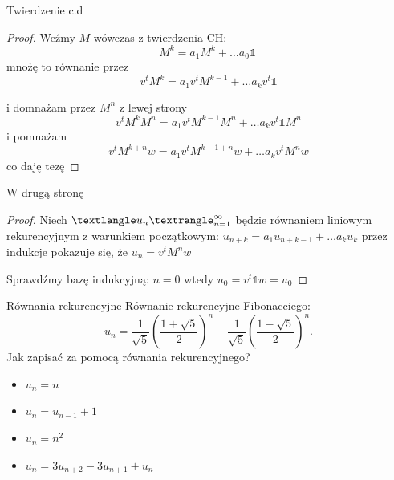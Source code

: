 \documentclass[handout]{beamer}
\theoremstyle{definition}
\theoremstyle{named}
\begin{document}
\begin{frame}{Twierdzenie c.d}

\begin{proof}
    Weźmy $M$ wówczas z twierdzenia CH: 
    \begin{equation}
        M^{k} =  a_1 M^{k} + \ldots a_0 \mathbb{1} \
    \end{equation}
    mnożę to równanie przez 
    \begin{equation}
        v^{t}M^{k} = a_1 v^{t} M^{k-1} + \ldots a_k v^{t} \mathbb{1} 
    \end{equation} 


i domnażam przez $M^{n}$ z lewej strony 
      \begin{equation}
          v^{t}M^{k} M^{n} = a_1 v^{t} M^{k-1} M^{n} + \ldots a_k v^{t} \mathbb{1} M^{n}
      \end{equation}
      i pomnażam 
      $$ v^{t}M^{k + n} w = a_1 v^{t} M^{k-1 + n}w + \ldots a_k v^{t} M^{n}w $$ 
      co daję tezę
\end{proof}
\end{frame}

\begin{frame}{W drugą stronę}
\begin{proof}
    Niech $\textlangle u_n \textrangle_{n=1}^{\infty}$ będzie równaniem liniowym rekurencyjnym z warunkiem początkowym:
    $u_{n+k} = a_1 u_{n+k-1} + \ldots a_{k} u_{k}$
    przez indukcje pokazuje się, że $u_{n} = v^{t}M^{n}w $
    
    Sprawdźmy bazę indukcyjną:
    $n=0$
    wtedy $u_{0} = v^{t} \mathbb{1} w = u_0$
    
\end{proof}
\end{frame}



\begin{frame}{Równania rekurencyjne}
Równanie rekurencyjne Fibonacciego: 
$$
{\displaystyle u_{n}={\frac {1}{\sqrt {5}}}\left({\frac {1+{\sqrt {5}}}{2}}\right)^{n}-{\frac {1}{\sqrt {5}}}\left({\frac {1-{\sqrt {5}}}{2}}\right)^{n}.}
$$
 Jak zapisać za pomocą równania rekurencyjnego? 
\begin{itemize}
    \item  $u_n = n$
    \pause 
    \item $u_n = u_{n-1} + 1$
    \pause
    \item  $u_n = n^{2}$
    \pause
    \item $u_n = 3 u_{n+2} - 3u_{n+1} + u_n$

\end{itemize}

\end{frame}
\end{document}
